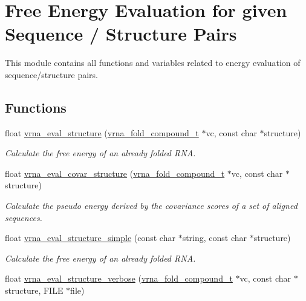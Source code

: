 \hypertarget{group__eval}{\section{Free Energy Evaluation for given Sequence / Structure Pairs}
\label{group__eval}
}


This module contains all functions and variables related to energy evaluation of sequence/structure pairs.  


\subsection*{Functions}
\begin{DoxyCompactItemize}
\item 
float \hyperlink{group__eval_ga58f199f1438d794a265f3b27fc8ea631}{vrna\-\_\-eval\-\_\-structure} (\hyperlink{group__fold__compound_ga1b0cef17fd40466cef5968eaeeff6166}{vrna\-\_\-fold\-\_\-compound\-\_\-t} $\ast$vc, const char $\ast$structure)
\begin{DoxyCompactList}\small\item\em Calculate the free energy of an already folded R\-N\-A. \end{DoxyCompactList}\item 
float \hyperlink{group__eval_ga6cea75c0eb9857fb59172be54cab09e0}{vrna\-\_\-eval\-\_\-covar\-\_\-structure} (\hyperlink{group__fold__compound_ga1b0cef17fd40466cef5968eaeeff6166}{vrna\-\_\-fold\-\_\-compound\-\_\-t} $\ast$vc, const char $\ast$structure)
\begin{DoxyCompactList}\small\item\em Calculate the pseudo energy derived by the covariance scores of a set of aligned sequences. \end{DoxyCompactList}\item 
float \hyperlink{group__eval_gab6930f446d04761454d033680fbf7909}{vrna\-\_\-eval\-\_\-structure\-\_\-simple} (const char $\ast$string, const char $\ast$structure)
\begin{DoxyCompactList}\small\item\em Calculate the free energy of an already folded R\-N\-A. \end{DoxyCompactList}\item 
float \hyperlink{group__eval_ga0928d699d310178f84ee2351034e5cb5}{vrna\-\_\-eval\-\_\-structure\-\_\-verbose} (\hyperlink{group__fold__compound_ga1b0cef17fd40466cef5968eaeeff6166}{vrna\-\_\-fold\-\_\-compound\-\_\-t} $\ast$vc, const char $\ast$structure, F\-I\-L\-E $\ast$file)

\end{DoxyCompactItemize}
